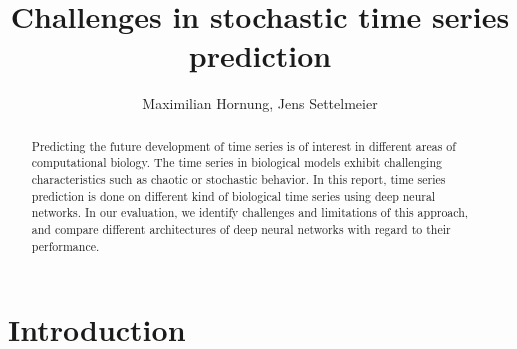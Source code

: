 \documentclass{article}
\title{Challenges in stochastic time series prediction}
\author{Maximilian Hornung, Jens Settelmeier}
\begin{document}
\maketitle

\begin{abstract}
    Predicting the future development of time series is of interest in different
    areas of computational biology. The time series in biological models exhibit
    challenging characteristics such as chaotic or stochastic behavior. In this
    report, time series prediction is done on different kind of biological time
    series using deep neural networks. In our evaluation, we identify challenges
    and limitations of this approach, and compare different architectures of
    deep neural networks with regard to their performance.
\end{abstract}

\section{Introduction}
    
\end{document}
